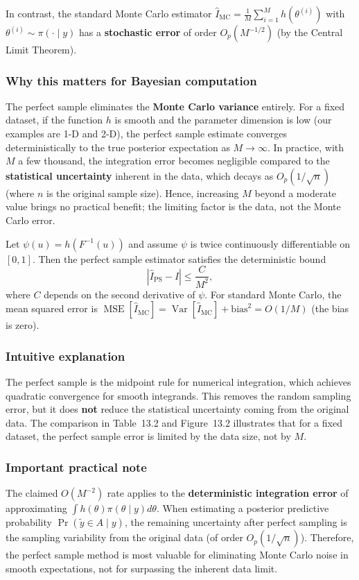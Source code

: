 In contrast, the standard Monte Carlo estimator \(\hat{I}_{\text{MC}} = \frac{1}{M}\sum_{i=1}^{M} h(\theta^{(i)})\) with \(\theta^{(i)}\sim\pi(\cdot\mid y)\) has a \textbf{stochastic error} of order \(O_p(M^{-1/2})\) (by the Central Limit Theorem).

\subsubsection*{Why this matters for Bayesian computation}
The perfect sample eliminates the \textbf{Monte Carlo variance} entirely. For a fixed dataset, if the function \(h\) is smooth and the parameter dimension is low (our examples are 1-D and 2-D), the perfect sample estimate converges deterministically to the true posterior expectation as \(M\to\infty\). In practice, with \(M\) a few thousand, the integration error becomes negligible compared to the \textbf{statistical uncertainty} inherent in the data, which decays as \(O_p(1/\sqrt{n})\) (where \(n\) is the original sample size). Hence, increasing \(M\) beyond a moderate value brings no practical benefit; the limiting factor is the data, not the Monte Carlo error.

\begin{theorem}
Let \(\psi(u)=h(F^{-1}(u))\) and assume \(\psi\) is twice continuously differentiable on \([0,1]\). Then the perfect sample estimator satisfies the deterministic bound
\[
|\hat{I}_{\text{PS}} - I| \le \frac{C}{M^2},
\]
where \(C\) depends on the second derivative of \(\psi\). For standard Monte Carlo, the mean squared error is \(\operatorname{MSE}[\hat{I}_{\text{MC}}] = \operatorname{Var}[\hat{I}_{\text{MC}}] + \text{bias}^2 = O(1/M)\) (the bias is zero).
\end{theorem}

\subsubsection*{Intuitive explanation}
The perfect sample is the midpoint rule for numerical integration, which achieves quadratic convergence for smooth integrands. This removes the random sampling error, but it does \textbf{not} reduce the statistical uncertainty coming from the original data. The comparison in Table~13.2 and Figure~13.2 illustrates that for a fixed dataset, the perfect sample error is limited by the data size, not by \(M\).

\subsubsection*{Important practical note}
The claimed \(O(M^{-2})\) rate applies to the \textbf{deterministic integration error} of approximating \(\int h(\theta)\pi(\theta\mid y)d\theta\). When estimating a posterior predictive probability \(\Pr(\tilde y\in A\mid y)\), the remaining uncertainty after perfect sampling is the sampling variability from the original data (of order \(O_p(1/\sqrt{n})\)). Therefore, the perfect sample method is most valuable for eliminating Monte Carlo noise in smooth expectations, not for surpassing the inherent data limit.

